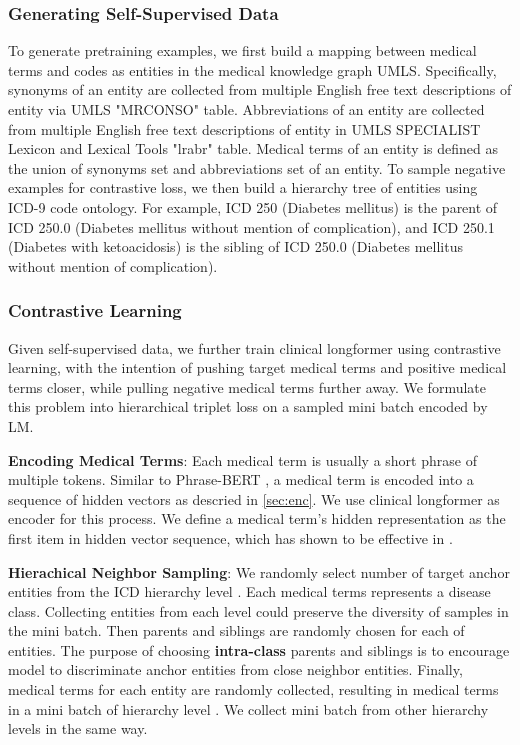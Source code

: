 \documentclass[11pt]{article}
\begin{document}
\subsubsection{Generating Self-Supervised Data} \label{sec:sapa}
To generate pretraining examples, we first build a mapping between medical terms and codes as entities in the medical knowledge graph UMLS. Specifically, synonyms of an entity are collected from multiple English free text descriptions of entity via UMLS "MRCONSO" table. Abbreviations of an entity are collected from multiple English free text descriptions of entity in UMLS SPECIALIST Lexicon and Lexical Tools "lrabr" table. Medical terms of an entity is defined as the union of synonyms set and abbreviations set of an entity. To sample negative examples for contrastive loss, we then build a hierarchy tree of entities using ICD-9 code ontology. For example, ICD 250 (Diabetes mellitus) is the parent of ICD 250.0 (Diabetes mellitus without mention of complication), and ICD 250.1 (Diabetes with ketoacidosis) is the sibling of ICD 250.0 (Diabetes mellitus without mention of complication).


\subsubsection{Contrastive Learning} \label{sec:sapb}
Given self-supervised data, we further train clinical longformer using contrastive learning, with the intention of pushing target medical terms and positive medical terms closer, while pulling negative medical terms further away. We formulate this problem into hierarchical triplet loss on  a sampled mini batch encoded by LM.

\textbf{Encoding Medical Terms}:
Each medical term is usually a short phrase of multiple tokens. Similar to Phrase-BERT \citep{wang-etal-2021-phrase}, a medical term is encoded into a sequence of hidden vectors as descried in \textsection \ref{sec:enc}. We use clinical longformer \citep{Li2022ClinicalLongformerAC} as encoder for this process. We define a medical term's hidden representation  as the first item in hidden vector sequence, which has shown to be effective in \citet{toshniwal-etal-2020-cross}.

\textbf{Hierachical Neighbor Sampling}:
We randomly select  number of target anchor entities from the ICD hierarchy level . Each medical terms represents a disease class. Collecting entities from each level could preserve the diversity of samples in the mini batch.
Then  parents and siblings are randomly chosen for each of  entities. The purpose of choosing \textbf{intra-class} parents and siblings is to encourage model to discriminate anchor entities from close neighbor entities. Finally,  medical terms for each entity are randomly collected, resulting in  medical terms in a mini batch  of hierarchy level . We collect mini batch from other hierarchy levels in the same way.
\end{document}
